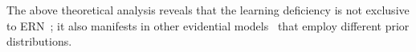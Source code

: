 The above theoretical analysis reveals that the learning deficiency is not exclusive to ERN~\cite{NEURIPS2020_aab08546}; it also manifests in other evidential models~\cite{meinert2021multivariate} that employ different prior distributions. 





